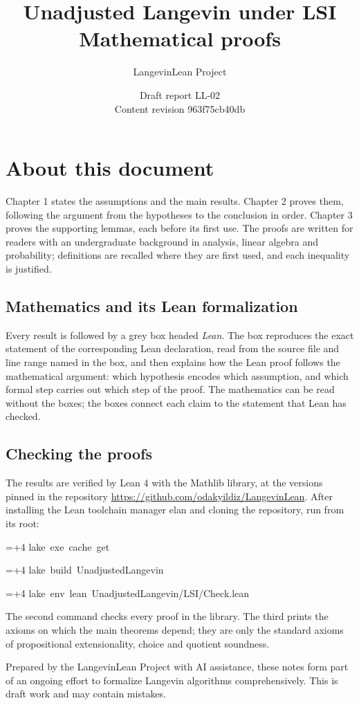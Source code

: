 \documentclass[11pt,a4paper]{report}
\title{\texorpdfstring{Unadjusted Langevin under LSI}{Unadjusted Langevin under LSI}\\[0.6em]\large Mathematical proofs}
\author{LangevinLean Project}
\date{Draft report LL-02\\[0.4em]\small Content revision 963f75cb40db}
\newlength{\leancharwidth}
\newenvironment{leancode}{\par\smallskip\begingroup\ttfamily\footnotesize\raggedright
  \settowidth{\leancharwidth}{M}\setlength{\parskip}{0pt}\setlength{\parindent}{0pt}
  \frenchspacing}{\par\endgroup\smallskip}
\newcommand{\leanline}[2]{\hangindent=\dimexpr#1\leancharwidth+4\leancharwidth\relax
  \hangafter=1\noindent\hspace*{#1\leancharwidth}#2\par}
\begin{document}
\maketitle
\chapter*{About this document}
Chapter 1 states the assumptions and the main results. Chapter 2 proves them, following the argument from the hypotheses to the conclusion in order. Chapter 3 proves the supporting lemmas, each before its first use. The proofs are written for readers with an undergraduate background in analysis, linear algebra and probability; definitions are recalled where they are first used, and each inequality is justified.

\section*{Mathematics and its Lean formalization}
Every result is followed by a grey box headed \emph{Lean}. The box reproduces the exact statement of the corresponding Lean declaration, read from the source file and line range named in the box, and then explains how the Lean proof follows the mathematical argument: which hypothesis encodes which assumption, and which formal step carries out which step of the proof. The mathematics can be read without the boxes; the boxes connect each claim to the statement that Lean has checked.

\section*{Checking the proofs}
The results are verified by Lean 4 with the Mathlib library, at the versions pinned in the repository \url{https://github.com/odakyildiz/LangevinLean}. After installing the Lean toolchain manager elan and cloning the repository, run from its root:
\begin{leancode}
\leanline{0}{lake\ exe\ cache\ get}
\leanline{0}{lake\ build\ UnadjustedLangevin}
\leanline{0}{lake\ env\ lean\ UnadjustedLangevin/LSI/Check.lean}
\end{leancode}
The second command checks every proof in the library. The third prints the axioms on which the main theorems depend; they are only the standard axioms of propositional extensionality, choice and quotient soundness.

Prepared by the LangevinLean Project with AI assistance, these notes form part of an ongoing effort to formalize Langevin algorithms comprehensively. This is draft work and may contain mistakes.
\end{document}
